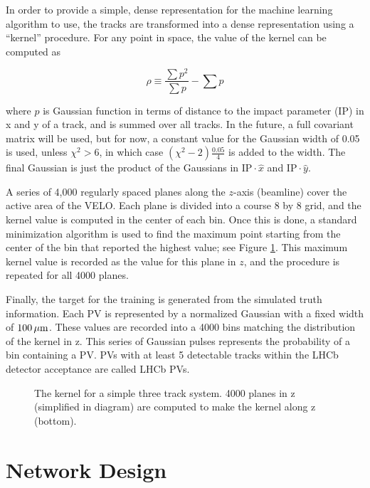 \documentclass[a4paper]{jpconf}
\begin{document}
In order to provide a simple, dense representation for the machine learning algorithm to use, the tracks are transformed into a dense representation using a ``kernel'' procedure. For any point in space, the value of the kernel can be computed as 

\begin{equation}
\rho \equiv  \frac{ \sum  p^2}{\sum  p} - \sum p
\end{equation}

where $p$ is Gaussian function in terms of distance to the impact parameter (IP) in x and y of a track, and is summed over all tracks.
In the future, a full covariant matrix will be used, but for now, a constant value for the Gaussian width of 0.05 is used, unless $\chi^2>6$, in which case $ (\chi^2-2)\frac{0.05}{4} $ is added to the width.
The final Gaussian is just the product of the Gaussians in $ \mathrm{IP} \cdot \hat{x}$ and $ \mathrm{IP} \cdot \hat{y}$.

A series of 4,000 regularly spaced planes along the $z$-axis (beamline) cover the active area of the VELO. Each plane is divided into a course 8 by 8 grid, and the kernel value is computed in the center of each bin. Once this is done, a standard minimization algorithm is used to find the maximum point starting from the center of the bin that reported the highest value; see Figure \ref{fig:kernel}. This maximum kernel value is recorded as the value for this plane in $z$, and the procedure is repeated for all 4000 planes.

Finally, the target for the training is generated from the simulated truth information. Each PV is represented by a normalized Gaussian with a fixed width of $\unit[100]{\mu m}$. These values are recorded into a 4000 bins matching the distribution of the kernel in z. This series of Gaussian pulses represents the probability of a bin containing a PV.  %
PVs with at least 5 detectable tracks within the LHCb detector acceptance are called LHCb PVs.

\begin{figure}
	\centering
	
	\caption{The kernel for a simple three track system. 4000 planes in z (simplified in diagram) are computed to make the kernel along z (bottom).}
	\label{fig:kernel}
\end{figure}

\section{Network Design}
\end{document}
